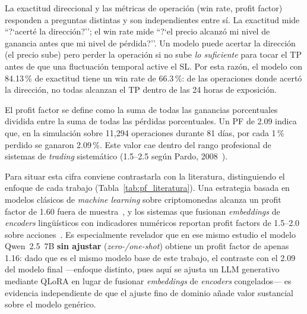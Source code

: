 \documentclass[10pt,twocolumn]{article}
\begin{document}
La exactitud direccional y las m\'etricas de operaci\'on (win rate, profit factor) responden a preguntas distintas y son independientes entre s\'i. La exactitud mide ``?`acert\'e la direcci\'on?''; el win rate mide ``?`el precio alcanz\'o mi nivel de ganancia antes que mi nivel de p\'erdida?''. Un modelo puede acertar la direcci\'on (el precio sube) pero perder la operaci\'on si no sube \textit{lo suficiente} para tocar el TP antes de que una fluctuaci\'on temporal active el SL. Por esta raz\'on, el modelo con 84.13\,\% de exactitud tiene un win rate de 66.3\,\%: de las operaciones donde acert\'o la direcci\'on, no todas alcanzan el TP dentro de las 24 horas de exposici\'on.

El profit factor se define como la suma de todas las ganancias porcentuales dividida entre la suma de todas las p\'erdidas porcentuales. Un PF de 2.09 indica que, en la simulaci\'on sobre 11,294 operaciones durante 81 d\'ias, por cada 1\,\% perdido se ganaron 2.09\,\%. Este valor cae dentro del rango profesional de sistemas de \textit{trading} sistem\'atico (1.5--2.5 seg\'un Pardo, 2008~\cite{pardo2008}).

Para situar esta cifra conviene contrastarla con la literatura, distinguiendo el enfoque de cada trabajo (Tabla~\ref{tab:pf_literatura}). Una estrategia basada en modelos cl\'asicos de \textit{machine learning} sobre criptomonedas alcanza un profit factor de 1.60 fuera de muestra~\cite{asgari2021}, y los sistemas que fusionan \textit{embeddings} de \textit{encoders} ling\"u\'isticos con indicadores num\'ericos reportan profit factors de 1.5--2.0 sobre acciones~\cite{khanna2025stonk}. Es especialmente revelador que en ese mismo estudio el modelo Qwen~2.5~7B \textbf{sin ajustar} (\textit{zero-/one-shot}) obtiene un profit factor de apenas 1.16: dado que es el mismo modelo base de este trabajo, el contraste con el 2.09 del modelo final ---enfoque distinto, pues aqu\'i se ajusta un LLM generativo mediante QLoRA en lugar de fusionar \textit{embeddings} de \textit{encoders} congelados--- es evidencia independiente de que el ajuste fino de dominio a\~nade valor sustancial sobre el modelo gen\'erico.
\end{document}
